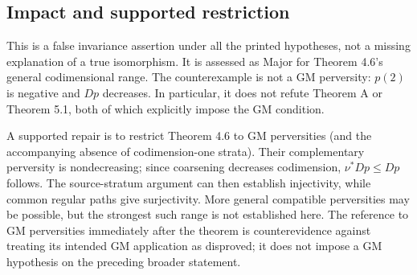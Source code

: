 \documentclass[10pt]{article}
\begin{document}
\subsection*{Impact and supported restriction}
This is a false invariance assertion under all the printed hypotheses, not a missing explanation of a true isomorphism. It is assessed as Major for Theorem 4.6’s general codimensional range. The counterexample is not a GM perversity: \(p(2)\) is negative and \(Dp\) decreases. In particular, it does not refute Theorem A or Theorem 5.1, both of which explicitly impose the GM condition.\par
A supported repair is to restrict Theorem 4.6 to GM perversities (and the accompanying absence of codimension-one strata). Their complementary perversity is nondecreasing; since coarsening decreases codimension, \(\nu^*Dp\leq Dp\) follows. The source-stratum argument can then establish injectivity, while common regular paths give surjectivity. More general compatible perversities may be possible, but the strongest such range is not established here. The reference to GM perversities immediately after the theorem is counterevidence against treating its intended GM application as disproved; it does not impose a GM hypothesis on the preceding broader statement.\par
\end{document}
